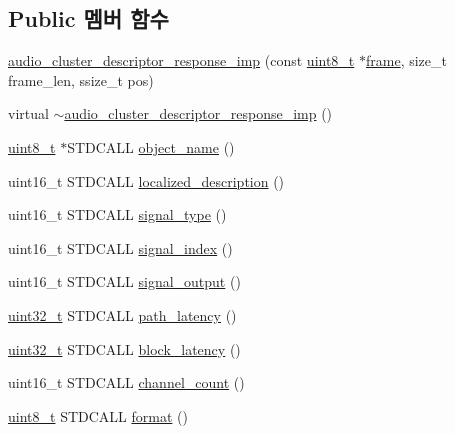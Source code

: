 \subsection*{Public 멤버 함수}
\begin{DoxyCompactItemize}
\item 
\hyperlink{classavdecc__lib_1_1audio__cluster__descriptor__response__imp_a7ca3a0edc84ff881e7c9cf93fa658c9c}{audio\+\_\+cluster\+\_\+descriptor\+\_\+response\+\_\+imp} (const \hyperlink{stdint_8h_aba7bc1797add20fe3efdf37ced1182c5}{uint8\+\_\+t} $\ast$\hyperlink{gst__avb__playbin_8c_ac8e710e0b5e994c0545d75d69868c6f0}{frame}, size\+\_\+t frame\+\_\+len, ssize\+\_\+t pos)
\item 
virtual \hyperlink{classavdecc__lib_1_1audio__cluster__descriptor__response__imp_a80c64a10cd81300ec80131db42c30308}{$\sim$audio\+\_\+cluster\+\_\+descriptor\+\_\+response\+\_\+imp} ()
\item 
\hyperlink{stdint_8h_aba7bc1797add20fe3efdf37ced1182c5}{uint8\+\_\+t} $\ast$S\+T\+D\+C\+A\+LL \hyperlink{classavdecc__lib_1_1audio__cluster__descriptor__response__imp_a15837e3eb254ad44812cb766ae8cd53c}{object\+\_\+name} ()
\item 
uint16\+\_\+t S\+T\+D\+C\+A\+LL \hyperlink{classavdecc__lib_1_1audio__cluster__descriptor__response__imp_aa94307532fbb37e2f986fee8fec79373}{localized\+\_\+description} ()
\item 
uint16\+\_\+t S\+T\+D\+C\+A\+LL \hyperlink{classavdecc__lib_1_1audio__cluster__descriptor__response__imp_a34860693b568102d329b58e59fc48de5}{signal\+\_\+type} ()
\item 
uint16\+\_\+t S\+T\+D\+C\+A\+LL \hyperlink{classavdecc__lib_1_1audio__cluster__descriptor__response__imp_a241ca834786f33bea20ff8108b16655c}{signal\+\_\+index} ()
\item 
uint16\+\_\+t S\+T\+D\+C\+A\+LL \hyperlink{classavdecc__lib_1_1audio__cluster__descriptor__response__imp_a9959f2c7f3f5be25a66967f1b8feba97}{signal\+\_\+output} ()
\item 
\hyperlink{parse_8c_a6eb1e68cc391dd753bc8ce896dbb8315}{uint32\+\_\+t} S\+T\+D\+C\+A\+LL \hyperlink{classavdecc__lib_1_1audio__cluster__descriptor__response__imp_ad6f3d255732e357d49449f69402af22e}{path\+\_\+latency} ()
\item 
\hyperlink{parse_8c_a6eb1e68cc391dd753bc8ce896dbb8315}{uint32\+\_\+t} S\+T\+D\+C\+A\+LL \hyperlink{classavdecc__lib_1_1audio__cluster__descriptor__response__imp_af73005227357cf68983ec8157b6c0ad9}{block\+\_\+latency} ()
\item 
uint16\+\_\+t S\+T\+D\+C\+A\+LL \hyperlink{classavdecc__lib_1_1audio__cluster__descriptor__response__imp_a574ec42d4a267428a0b1fd12e0f2dfd4}{channel\+\_\+count} ()
\item 
\hyperlink{stdint_8h_aba7bc1797add20fe3efdf37ced1182c5}{uint8\+\_\+t} S\+T\+D\+C\+A\+LL \hyperlink{classavdecc__lib_1_1audio__cluster__descriptor__response__imp_af53e48503fcc07f6a05be9567ac62bc8}{format} ()
\end{DoxyCompactItemize}
